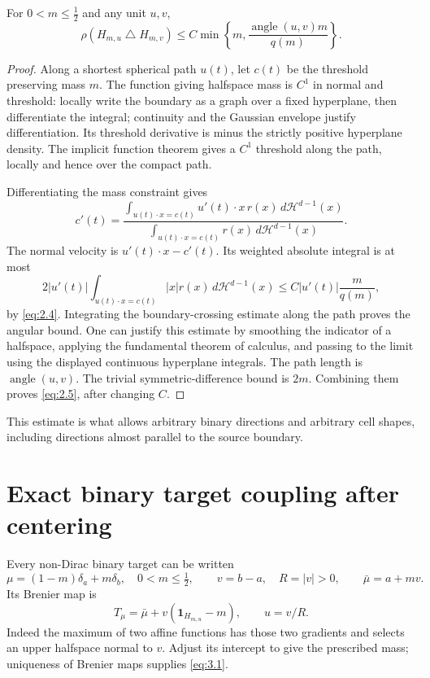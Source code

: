 For $0<m\le\tfrac12$ and any unit $u,v$,
\begin{equation}
  \rho(H_{m,u}\mathbin{\triangle}H_{m,v})
  \le C\min\!\left\{m,\frac{\operatorname{angle}(u,v)m}{q(m)}\right\}.
  \tag{2.5}\label{eq:2.5}
\end{equation}
\begin{proof}
Along a shortest spherical path $u(t)$, let $c(t)$ be the threshold preserving mass $m$. The function giving halfspace mass is $C^1$ in normal and threshold: locally write the boundary as a graph over a fixed hyperplane, then differentiate the integral; continuity and the Gaussian envelope justify differentiation. Its threshold derivative is minus the strictly positive hyperplane density. The implicit function theorem gives a $C^1$ threshold along the path, locally and hence over the compact path.

Differentiating the mass constraint gives
\[
  c'(t)=
  \frac{\displaystyle\int_{u(t)\cdot x=c(t)}
    u'(t)\cdot x\,r(x)\,d\mathcal H^{d-1}(x)}
  {\displaystyle\int_{u(t)\cdot x=c(t)}
    r(x)\,d\mathcal H^{d-1}(x)}.
\]
The normal velocity is $u'(t)\cdot x-c'(t)$. Its weighted absolute integral is at most
\begin{equation}
  2|u'(t)|\int_{u(t)\cdot x=c(t)}|x|r(x)\,d\mathcal H^{d-1}(x)
  \le C|u'(t)|\frac{m}{q(m)},
  \tag{2.6}\label{eq:2.6}
\end{equation}
by \eqref{eq:2.4}. Integrating the boundary-crossing estimate along the path proves the angular bound. One can justify this estimate by smoothing the indicator of a halfspace, applying the fundamental theorem of calculus, and passing to the limit using the displayed continuous hyperplane integrals. The path length is $\operatorname{angle}(u,v)$. The trivial symmetric-difference bound is $2m$. Combining them proves \eqref{eq:2.5}, after changing $C$.
\end{proof}

This estimate is what allows arbitrary binary directions and arbitrary cell shapes, including directions almost parallel to the source boundary.

\section{Exact binary target coupling after centering}\label{sec:3}

Every non-Dirac binary target can be written
\[
  \mu=(1-m)\delta_a+m\delta_b,\quad 0<m\le\tfrac12,
  \qquad v=b-a,\quad R=|v|>0,
  \qquad\bar\mu=a+mv.
\]
Its Brenier map is
\begin{equation}
  T_\mu=\bar\mu+v(\mathbf1_{H_{m,u}}-m),
  \qquad u=v/R.
  \tag{3.1}\label{eq:3.1}
\end{equation}
Indeed the maximum of two affine functions has those two gradients and selects an upper halfspace normal to $v$. Adjust its intercept to give the prescribed mass; uniqueness of Brenier maps supplies \eqref{eq:3.1}.

